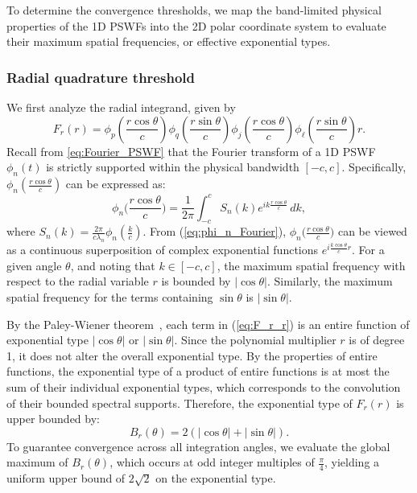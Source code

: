 \documentclass[lettersize,journal]{IEEEtran}
\theoremstyle{plain}
\begin{document}
\section{}
\label{appendix:quadrature_nodes}
To determine the convergence thresholds, we map the band-limited physical properties of the 1D PSWFs into the 2D polar coordinate system to evaluate their maximum spatial frequencies, or effective exponential types.

\subsubsection{Radial quadrature threshold} We first analyze the radial integrand, given by
\begin{equation}
	F_r(r) = \phi_p(\frac{r\cos\theta}{c})\phi_q(\frac{r\sin\theta}{c})\phi_j(\frac{r\cos\theta}{c})\phi_\ell(\frac{r\sin\theta}{c})r.
	\label{eq:F_r_r}
\end{equation}
Recall from \eqref{eq:Fourier_PSWF} that the Fourier transform of a 1D PSWF $\phi_n(t)$ is strictly supported within the physical bandwidth $[-c, c]$. Specifically, $\phi_n(\frac{r\cos\theta}{c})$ can be expressed as:
\begin{equation}
	\phi_n\Big(\frac{r\cos\theta}{c}\Big) = \frac{1}{2\pi}\int_{-c}^{c} S_n(k) e^{i k \frac{r\cos\theta}{c}} \,dk,
	\label{eq:phi_n_Fourier}
\end{equation}
where $S_n(k) = \frac{2\pi}{c \lambda_n}\phi_n(\frac{k}{c})$.
From (\ref{eq:phi_n_Fourier}), $\phi_n\Big(\frac{r\cos\theta}{c}\Big) $ can be viewed as a continuous superposition of complex exponential functions $e^{i\frac{k\cos\theta}{c}r}$. 
For a given angle $\theta$, and noting that $k\in[-c, c]$, the maximum spatial frequency with respect to the radial variable $r$ is bounded by $\left|\cos\theta\right|$.
Similarly, the maximum spatial frequency for the terms containing $\sin\theta$ is $|\sin\theta|$.

By the Paley-Wiener theorem~\cite{rudin1974real}, each term in (\ref{eq:F_r_r}) is an entire function of exponential type $|\cos\theta|$ or $|\sin\theta|$. Since the polynomial multiplier $r$ is of degree 1, it does not alter the overall exponential type.
By the properties of entire functions, the exponential type of a product of entire functions is at most the sum of their individual exponential types, which corresponds to the convolution of their bounded spectral supports.
Therefore, the exponential type of $F_r(r)$ is upper bounded by:
$$
	B_r(\theta) = 2(\left|\cos\theta\right| + \left|\sin\theta\right|).
	\label{eq:total_bandwidth}
$$
To guarantee convergence across all integration angles, we evaluate the global maximum of $B_r(\theta)$, which occurs at odd integer multiples of $\frac{\pi}{4}$,
yielding a uniform upper bound of $2\sqrt{2}$ on the exponential type. 
\end{document}
